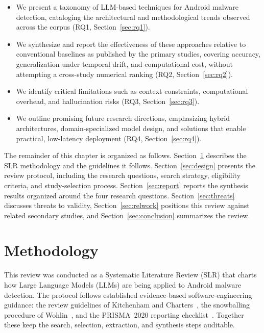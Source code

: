 \begin{itemize}
    \item We present a taxonomy of LLM-based techniques for Android malware detection, cataloging the architectural and methodological trends observed across the corpus (RQ1, Section~\ref{sec:rq1}).
    \item We synthesize and report the effectiveness of these approaches relative to conventional baselines as published by the primary studies, covering accuracy, generalization under temporal drift, and computational cost, without attempting a cross-study numerical ranking (RQ2, Section~\ref{sec:rq2}).
    \item We identify critical limitations such as context constraints, computational overhead, and hallucination risks (RQ3, Section~\ref{sec:rq3}).
    \item We outline promising future research directions, emphasizing hybrid architectures, domain-specialized model design, and solutions that enable practical, low-latency deployment (RQ4, Section~\ref{sec:rq4}).
\end{itemize}

The remainder of this chapter is organized as follows. Section~\ref{sec:method} describes the SLR methodology and the guidelines it follows. Section~\ref{sec:design} presents the review protocol, including the research questions, search strategy, eligibility criteria, and study-selection process. Section~\ref{sec:report} reports the synthesis results organized around the four research questions. Section~\ref{sec:threats} discusses threats to validity, Section~\ref{sec:relwork} positions this review against related secondary studies, and Section~\ref{sec:conclusion} summarizes the review.

\section{Methodology}\label{sec:method}

This review was conducted as a Systematic Literature Review (SLR) that charts how Large Language Models (LLMs) are being applied to Android malware detection. The protocol follows established evidence-based software-engineering guidance: the review guidelines of Kitchenham and Charters~\cite{kitchenham2007guidelines}, the snowballing procedure of Wohlin~\cite{wohlin2014guidelines}, and the PRISMA~2020 reporting checklist~\cite{Page2021PRISMA}. Together these keep the search, selection, extraction, and synthesis steps auditable.

